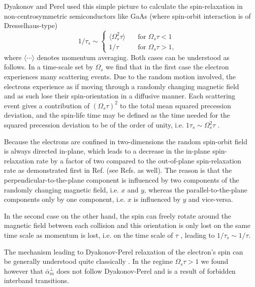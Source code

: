 Dyakonov and Perel \cite{dyakonov1972spin, DYAKONOV1986} used this simple picture to calculate the spin-relaxation in non-centrosymmetric semiconductors like GaAs (where spin-orbit interaction is of Dresselhaus-type)
\begin{equation}
	1/\tau_s \sim \begin{cases}
    	\langle \Omega^2_s\tau\rangle & \quad\text{for  } \Omega_s\tau < 1\\
        1/\tau  &\quad \text{for  }  \Omega_s\tau>1,
    \end{cases}
\end{equation}where $\langle\cdots\rangle$ denotes momentum averaging. Both cases can be understood as follows. In a time-scale set by $\Omega_s$ we find that in the first case the electron experiences many scattering events. Due to the random motion involved, the electrons experience as if moving through a randomly changing magnetic field and as such lose their spin-orientation in a diffusive manner. Each scattering event gives a contribution of $(\Omega_s\tau)^2$ to the total mean squared precession deviation, and the spin-life time may be defined as the time needed for the squared precession deviation to be of the order of unity, i.e. $1\tau_s\sim \Omega_s^2\tau$ \cite{dyakonov_spintronics_2004, dyakonov_spin_2017}. 

Because the electrons are confined in two-dimensions the random spin-orbit field is always directed in-plane, which leads to a decrease in the in-plane spin-relaxation rate by a factor of two compared to the out-of-plane spin-relaxation rate as demonstrated first in Ref. \cite{DYAKONOV1986} (see Refs. \cite{aronov_spin_1983, averkiev_spin_2002, burkov_theory_2004, dyakonov_spin_2017} as well).  The reason is that the perpendicular-to-the-plane component is influenced by two components of the randomly changing magnetic field, i.e. $x$ and $y$, whereas the parallel-to-the-plane components only by one component, i.e. $x$ is influenced by $y$ and vice-versa.  

In the second case on the other hand, the spin can freely rotate around the magnetic field between each collision and this orientation is only lost on the same time scale as momentum is lost, i.e. on the time scale of $\tau$ \cite{aronov_spin_1983, dyakonov_spintronics_2004}, leading to $1/\tau_s \sim 1/\tau$.

The mechanism leading to Dyakonov-Perel relaxation of the electron's spin can be generally understood quite classically \cite{dyakonov_spintronics_2004}. In the regime $\Omega_s \tau > 1$ we found however that $\bar{\alpha}_m^{\perp}$ does not follow Dyakonov-Perel and is a result of forbidden interband transitions. 

